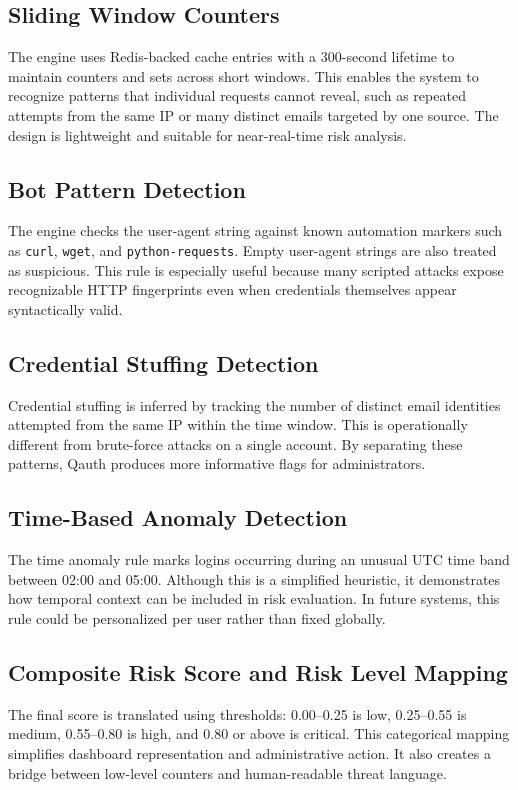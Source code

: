 \subsection{Sliding Window Counters}
The engine uses Redis-backed cache entries with a 300-second lifetime to maintain counters and sets across short windows. This enables the system to recognize patterns that individual requests cannot reveal, such as repeated attempts from the same IP or many distinct emails targeted by one source. The design is lightweight and suitable for near-real-time risk analysis.

\subsection{Bot Pattern Detection}
The engine checks the user-agent string against known automation markers such as \texttt{curl}, \texttt{wget}, and \texttt{python-requests}. Empty user-agent strings are also treated as suspicious. This rule is especially useful because many scripted attacks expose recognizable HTTP fingerprints even when credentials themselves appear syntactically valid.

\subsection{Credential Stuffing Detection}
Credential stuffing is inferred by tracking the number of distinct email identities attempted from the same IP within the time window. This is operationally different from brute-force attacks on a single account. By separating these patterns, Qauth produces more informative flags for administrators.

\subsection{Time-Based Anomaly Detection}
The time anomaly rule marks logins occurring during an unusual UTC time band between 02:00 and 05:00. Although this is a simplified heuristic, it demonstrates how temporal context can be included in risk evaluation. In future systems, this rule could be personalized per user rather than fixed globally.

\subsection{Composite Risk Score and Risk Level Mapping}
The final score is translated using thresholds: 0.00--0.25 is low, 0.25--0.55 is medium, 0.55--0.80 is high, and 0.80 or above is critical. This categorical mapping simplifies dashboard representation and administrative action. It also creates a bridge between low-level counters and human-readable threat language.

